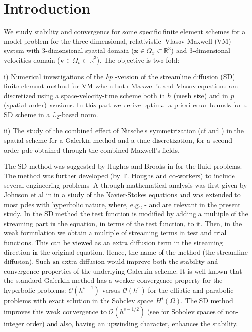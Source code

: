 \documentclass[reqno,a4paper]{amsart}
\theoremstyle{remark}
\numberwithin{equation}{section}
\def\bv{\mathbf{v}}
\def\bx{\mathbf{x}}
\begin{document}
\maketitle

\section{Introduction}

We study stability and convergence for some specific finite element 
schemes for a model problem for the three dimensional, 
relativistic, Vlasov-Maxwell (VM) system 
with 3-dimensional spatial domain ($\bx\in\Omega_x\subset{\mathbb R}^3$) 
and 3-dimensional velocities domain ($\bv \in\Omega_v\subset{\mathbb R}^3$).  
The objective is two-fold: 

i)  Numerical investigations of the $hp$ 
-version of the streamline diffusion (SD)
finite element method for VM where both Maxwell's 
and Vlasov equations are discretized using a 
space-velocity-time scheme both in $h$ (mesh size) and 
in $p$ (spatial order) versions. In this part we derive optimal 
a priori error bounds for a SD scheme in a
$L_2$-based norm.

ii) 
The study of the combined 
effect of Nitsche's symmetrization (cf \cite{Nitsche} and \cite{AssousMichaeli})
in the spatial scheme for a Galerkin method 
and a time discretization, for a second order pde obtained through 
the combined Maxwell's fields. 

The SD method was suggested by Hughes and Brooks in \cite{Hughes_Brooks:79} 
for the 
fluid problems. The method was further developed  
(by T. Houghs and co-workers) to include several engineering problems. 
A through mathematical analysis was first given by Johnson et al in 
\cite{John} in a study of the Navier-Stokes equations and was 
extended to most pdes with hyperbolic nature, where, e.g., 
\cite{Asad}-\cite{AsadSopas} and \cite{Szepessy} 
are relevant in the present study. 
In the SD method the test function is modified by adding       a multiple 
of the streaming part in the equation, in terms of the test function, to it. 
Then, in the weak formulation we obtain a multiple of streaming 
terms in test and trial functions. 
This can be viewed as an extra diffusion term in the streaming direction in 
the original equation. Hence, the name of the method 
(the streamline diffusion). Such an extra diffusion would improve both the 
stability and convergence properties of the underlying Galerkin scheme. 
It is well known that the standard Galerkin method has a weaker convergence 
property for the 
hyperbolic problems: ${\mathcal O}(h^{s-1})$ versus  
${\mathcal O}(h^{s})$ for the elliptic and parabolic problems with  
exact solution in the Sobolev space $H^s(\Omega)$. 
The SD method improves this weak convergence to ${\mathcal O}(h^{s-1/2})$ 
(see \cite{Adams} for Sobolev spaces of non-integer order) 
and also, having an upwinding character, enhances the stability. 
\end{document}
